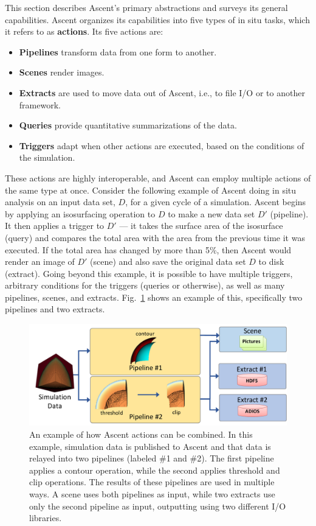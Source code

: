 This section describes Ascent's primary abstractions and surveys its general capabilities.
%
Ascent organizes its capabilities into five types of in situ tasks, which
it refers to as \textbf{actions}.
%
Its five actions are:
\begin{itemize}
\item \textbf{Pipelines} transform data from one form to another.
%
\item \textbf{Scenes} render images.
%
\item \textbf{Extracts} are used to move data out of Ascent, i.e., to file I/O or to another framework.
%
\item \textbf{Queries} provide quantitative summarizations of the data.
%
\item \textbf{Triggers} adapt when other actions are executed, based on the conditions of the simulation.
%
\end{itemize}

These actions are highly interoperable, and Ascent can employ multiple actions of the same type
at once.
%
Consider the following example of Ascent doing in situ analysis on an input data set, $D$,
for a given cycle of a simulation.
%
Ascent begins by applying an isosurfacing operation to $D$ to make a new data set $D'$ (pipeline).
%
It then applies a trigger to $D'$ --- it takes the surface area of the isosurface (query) and compares
the total area with the area from the previous time it was executed.
%
If the total area has changed by more than 5\%, then Ascent would render an image of $D'$ (scene)
and also save the original data set $D$ to disk (extract).
%
Going beyond this example, it is possible to have multiple triggers, arbitrary conditions for
the triggers (queries or otherwise), as well as many pipelines, scenes, and extracts.
%
Fig.~\ref{fig:ascent_example} shows an example of this, specifically two pipelines and two extracts.

\begin{figure}
\centering
\includegraphics[width=\textwidth]{images/ascent_actions_diagram_x2.pdf}
\caption{\label{fig:ascent_example} An example of how Ascent actions can be combined.
In this example, simulation data is published to Ascent
and that data is relayed into two pipelines (labeled \#1 and \#2).
The first pipeline applies a contour operation, while the second
applies threshold and clip operations.
%
The results of these pipelines are used in multiple ways.
A scene uses both pipelines as input, while two extracts use only the second pipeline
as input, outputting using two different I/O libraries.}
\end{figure}

